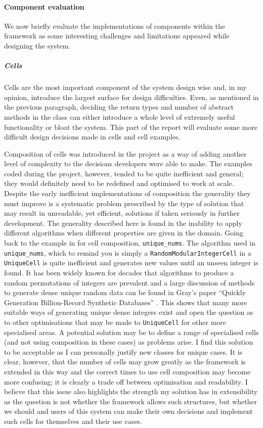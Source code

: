 \paragraph{Component evaluation} We now briefly evaluate the implementations of
components within the framework as some interesting challenges and limitations
appeared while designing the system.

\subparagraph{Cells} Cells are the most important component of the system design
wise and, in my opinion, introduce the largest surface for design difficulties.
Even, as mentioned in the previous paragraph, deciding the return types and
number of abstract methods in the class can either introduce a whole level of
extremely useful functionality or bloat the system. This part of the report will
evaluate some more difficult design decisions made in cells and cell examples.

Composition of cells was introduced in the project as a way of adding another
level of complexity to the decisions developers were able to make. The examples
coded during the project, however, tended to be quite inefficient and general;
they would definitely need to be redefined and optimised to work at scale.
Despite the early inefficient implementations of composition the generality they
must improve is a systematic problem prescribed by the type of solution that may result in unreadable, yet
efficient, solutions if taken seriously in further development. The
generality described here is found in the inability to apply different
algorithms when different properties are given in the domain. Going back to the
example in  for cell composition,
\lstinline{unique_nums}. The algorithm used in \lstinline{unique_nums}, which
to remind you is simply a \lstinline{RandomModularIntegerCell} in a
\lstinline{UniqueCell} is quite inefficient and generates new values until an unseen
integer is found. It has been widely known for decades that algorithms to
produce a random permutations of integers are prevalent and a large discussion
of methods to generate dense
unique random data can be found in Gray's paper ``Quickly Generation
Billion-Record Synthetic Databases'' \cite{GenLargeSynthDB}. This shows that
many more suitable ways of generating unique dense integers exist and open the
question as to other optimisations that may be made to \lstinline{UniqueCell}
for other more specialised areas. A potential solution may be to define a range
of specialised cells (and not using composition in these cases) as problems
arise. I find this solution to be acceptable as I can personally justify new
classes for unique cases. It is clear, however, that the number of cells may
grow greatly as the framework is extended in this way and the correct times to
use cell composition may become more confusing; it is
clearly a trade off between optimisation and readability. I believe that this
issue also highlights the strength my solution has in extensibility as the
question is not whether the framework allows such structures, but whether we
should and users of this system can make their own decisions and implement such
cells for themselves and their use cases.
